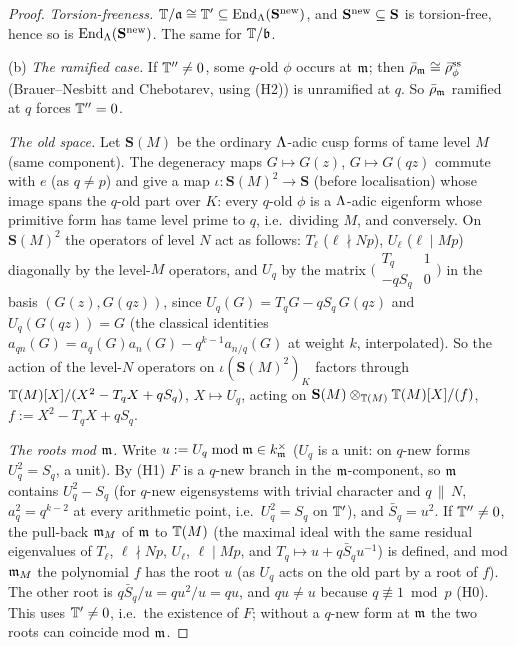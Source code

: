 \begin{proof}
\emph{Torsion-freeness.} $\mathbb{T}/\mathfrak{a}\cong\mathbb{T}'\subseteq\operatorname{End}_\Lambda(\mathbf S^{\rm new})$, and $\mathbf S^{\rm new}\subseteq\mathbf S$ is torsion-free, hence
so is $\operatorname{End}_\Lambda(\mathbf S^{\rm new})$. The same for $\mathbb{T}/\mathfrak{b}$.

(b) \emph{The ramified case.} If $\mathbb{T}''\ne0$, some $q$-old $\phi$ occurs at $\mathfrak{m}$; then $\bar\rho_{\mathfrak{m}}\cong\bar\rho_\phi^{\rm ss}$ (Brauer--Nesbitt
and Chebotarev, using (H2)) is unramified at $q$. So $\bar\rho_{\mathfrak{m}}$ ramified at $q$ forces $\mathbb{T}''=0$.

\emph{The old space.} Let $\mathbf S(M)$ be the ordinary $\Lambda$-adic cusp forms of tame level $M$ (same component). The degeneracy
maps $G\mapsto G(z)$, $G\mapsto G(qz)$ commute with $e$ (as $q\ne p$) and give a map $\iota:\mathbf S(M)^2\to\mathbf S$ (before
localisation) whose image spans the $q$-old part over $K$: every $q$-old $\phi$ is a $\Lambda$-adic eigenform whose primitive form has tame
level prime to $q$, i.e.\ dividing $M$, and conversely. On $\mathbf S(M)^2$ the operators of level $N$ act as follows: $T_\ell$
($\ell\nmid Np$), $U_\ell$ ($\ell\mid Mp$) diagonally by the level-$M$ operators, and $U_q$ by the matrix
$\big(\begin{smallmatrix}T_q&1\\-qS_q&0\end{smallmatrix}\big)$ in the basis $(G(z),G(qz))$, since $U_q(G)=T_qG-qS_q\,G(qz)$ and
$U_q(G(qz))=G$ (the classical identities $a_{qn}(G)=a_q(G)a_n(G)-q^{k-1}a_{n/q}(G)$ at weight $k$, interpolated). So the action of
the level-$N$ operators on $\iota(\mathbf S(M)^2)_K$ factors through $\mathbb{T}(M)[X]/(X^2-T_qX+qS_q)$, $X\mapsto U_q$, acting on
$\mathbf S(M)\otimes_{\mathbb{T}(M)}\mathbb{T}(M)[X]/(f)$, $f:=X^2-T_qX+qS_q$.

\emph{The roots mod $\mathfrak{m}$.} Write $u:=U_q\bmod\mathfrak{m}\in k_{\mathfrak{m}}^\times$ ($U_q$ is a unit: on $q$-new forms $U_q^2=S_q$, a unit).
By (H1) $F$ is a $q$-new branch in the $\mathfrak{m}$-component, so $\mathfrak{m}$ contains $U_q^2-S_q$ (for $q$-new eigensystems with trivial character
and $q\,\|\,N$, $a_q^2=q^{k-2}$ at every arithmetic point, i.e.\ $U_q^2=S_q$ on $\mathbb{T}'$), and $\bar S_q=u^2$. If $\mathbb{T}''\ne0$, the pull-back
$\mathfrak{m}_M$ of $\mathfrak{m}$ to $\mathbb{T}(M)$ (the maximal ideal with the same residual eigenvalues of $T_\ell$, $\ell\nmid Np$, $U_\ell$, $\ell\mid Mp$, and
$T_q\mapsto u+q\bar S_qu^{-1}$) is defined, and mod $\mathfrak{m}_M$ the polynomial $f$ has the root $u$ (as $U_q$ acts on the old part by a root of
$f$). The other root is $q\bar S_q/u=qu^2/u=qu$, and $qu\ne u$ because $q\not\equiv1\bmod p$ (H0). This uses $\mathbb{T}'\ne0$, i.e.\ the
existence of $F$; without a $q$-new form at $\mathfrak{m}$ the two roots can coincide mod $\mathfrak{m}$.


\end{proof}
